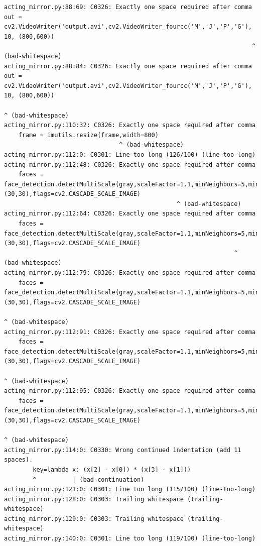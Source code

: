 \documentclass[runningheads,a4paper,11pt]{report}
\begin{document}
\begin{appendices}
\begin{lstlisting}
acting_mirror.py:88:69: C0326: Exactly one space required after comma
out = cv2.VideoWriter('output.avi',cv2.VideoWriter_fourcc('M','J','P','G'), 10, (800,600))
                                                                     ^ (bad-whitespace)
acting_mirror.py:88:84: C0326: Exactly one space required after comma
out = cv2.VideoWriter('output.avi',cv2.VideoWriter_fourcc('M','J','P','G'), 10, (800,600))
                                                                                    ^ (bad-whitespace)
acting_mirror.py:110:32: C0326: Exactly one space required after comma
    frame = imutils.resize(frame,width=800)
                                ^ (bad-whitespace)
acting_mirror.py:112:0: C0301: Line too long (126/100) (line-too-long)
acting_mirror.py:112:48: C0326: Exactly one space required after comma
    faces = face_detection.detectMultiScale(gray,scaleFactor=1.1,minNeighbors=5,minSize=(30,30),flags=cv2.CASCADE_SCALE_IMAGE)
                                                ^ (bad-whitespace)
acting_mirror.py:112:64: C0326: Exactly one space required after comma
    faces = face_detection.detectMultiScale(gray,scaleFactor=1.1,minNeighbors=5,minSize=(30,30),flags=cv2.CASCADE_SCALE_IMAGE)
                                                                ^ (bad-whitespace)
acting_mirror.py:112:79: C0326: Exactly one space required after comma
    faces = face_detection.detectMultiScale(gray,scaleFactor=1.1,minNeighbors=5,minSize=(30,30),flags=cv2.CASCADE_SCALE_IMAGE)
                                                                               ^ (bad-whitespace)
acting_mirror.py:112:91: C0326: Exactly one space required after comma
    faces = face_detection.detectMultiScale(gray,scaleFactor=1.1,minNeighbors=5,minSize=(30,30),flags=cv2.CASCADE_SCALE_IMAGE)
                                                                                           ^ (bad-whitespace)
acting_mirror.py:112:95: C0326: Exactly one space required after comma
    faces = face_detection.detectMultiScale(gray,scaleFactor=1.1,minNeighbors=5,minSize=(30,30),flags=cv2.CASCADE_SCALE_IMAGE)
                                                                                               ^ (bad-whitespace)
acting_mirror.py:114:0: C0330: Wrong continued indentation (add 11 spaces).
        key=lambda x: (x[2] - x[0]) * (x[3] - x[1]))
        ^          | (bad-continuation)
acting_mirror.py:121:0: C0301: Line too long (115/100) (line-too-long)
acting_mirror.py:128:0: C0303: Trailing whitespace (trailing-whitespace)
acting_mirror.py:129:0: C0303: Trailing whitespace (trailing-whitespace)
acting_mirror.py:140:0: C0301: Line too long (119/100) (line-too-long)

\end{lstlisting}
\end{appendices}
\end{document}
